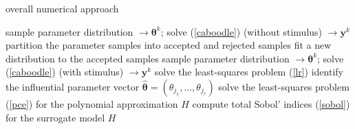 \begin{algorithm}
\caption{overall numerical approach}\label{algo}
\begin{algorithmic}[1]
 
\State sample parameter distribution  $\longrightarrow \boldsymbol{\theta}^k$; solve (\ref{caboodle}) (without stimulus) $\longrightarrow \mathbf y^k$
\EndFor
\State partition the parameter samples into accepted and rejected samples
\State fit a new distribution to the accepted samples 
\EndWhile
{} 
\State sample parameter distribution  $\longrightarrow \boldsymbol{\theta}^k$; solve (\ref{caboodle}) (with stimulus) $\longrightarrow \mathbf y^k$
\EndFor
{}
\State solve the least-squares problem (\ref{lr}) 
\State identify the influential parameter vector $\hat{\boldsymbol\theta} =   (\theta_{j_1}, \dots, \theta_{j_r})$  
\State solve the least-squares problem  (\ref{pce}) for the polynomial  approximation $H$ 
\State compute total Sobol' indices (\ref{sobol}) for the surrogate model $H$ 
\EndFor
\end{algorithmic}
\end{algorithm}




